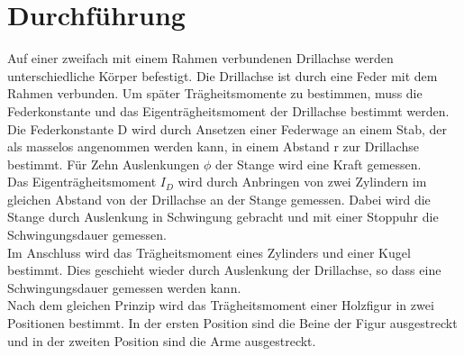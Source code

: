 \section{Durchführung}
\label{sec:Durchführung}
Auf einer zweifach mit einem Rahmen verbundenen Drillachse werden unterschiedliche Körper befestigt.
Die Drillachse ist durch eine Feder mit dem Rahmen verbunden. Um später Trägheitsmomente zu bestimmen,
muss die Federkonstante und das Eigenträgheitsmoment der Drillachse bestimmt werden. \\
Die Federkonstante D wird durch Ansetzen einer Federwage an einem Stab, der als masselos angenommen werden kann, 
in einem Abstand r zur Drillachse bestimmt. Für Zehn Auslenkungen $\phi$ der Stange wird eine Kraft gemessen.\\
Das Eigenträgheitsmoment $I_D$ wird durch Anbringen von zwei Zylindern im gleichen Abstand von der Drillachse
an der Stange gemessen. Dabei wird die Stange durch Auslenkung in Schwingung gebracht und mit einer Stoppuhr
die Schwingungsdauer gemessen.\\
Im Anschluss wird das Trägheitsmoment eines Zylinders und einer Kugel bestimmt. Dies geschieht wieder durch 
Auslenkung der Drillachse, so dass eine Schwingungsdauer gemessen werden kann.\\
Nach dem gleichen Prinzip wird das Trägheitsmoment einer Holzfigur in zwei Positionen bestimmt.
In der ersten Position sind die Beine der Figur ausgestreckt und in der zweiten Position sind die Arme ausgestreckt.
\newpage